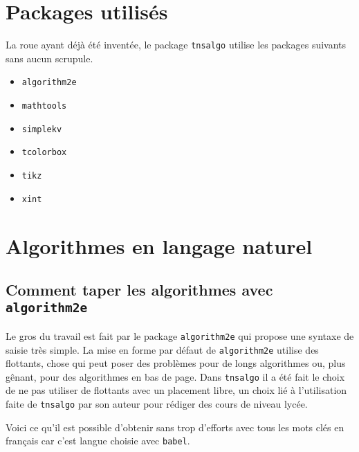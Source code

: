 \documentclass[12pt,a4paper]{article}
\theoremstyle{definition}
\begin{document}


\section{Packages utilisés}

La roue ayant déjà été inventée, le package \verb#tnsalgo# utilise les packages suivants sans aucun scrupule.

\begin{multicols}{4}
    \begin{itemize}
        \item \verb#algorithm2e#
        \item \verb#mathtools#
        \item \verb#simplekv#
        \item \verb#tcolorbox#
        \item \verb#tikz#
        \item \verb#xint#
    \end{itemize}
\end{multicols}
\newpage

\section{Algorithmes en langage naturel}

\subsection{Comment taper les algorithmes avec \texttt{algorithm2e}}

Le gros du travail est fait par le package \verb#algorithm2e# qui propose une syntaxe de saisie très simple.
La mise en forme par défaut de \verb#algorithm2e# utilise des flottants, chose qui peut poser des problèmes pour de longs algorithmes ou, plus gênant, pour des algorithmes en bas de page.
Dans \verb#tnsalgo# il a été fait le choix de ne pas utiliser de flottants avec un placement libre, un choix lié à l'utilisation faite de \verb#tnsalgo# par son auteur pour rédiger des cours de niveau lycée. 


\medskip


Voici ce qu'il est possible d'obtenir sans trop d'efforts avec tous les mots clés en français car c'est langue choisie avec \verb#babel#.
\end{document}

